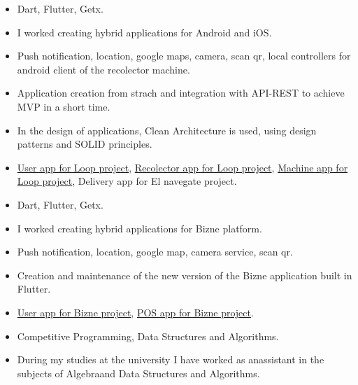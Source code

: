 \documentclass[10pt,a4paper]{altacv}
\begin{document}
\divider

\begin{itemize}
	\item Dart, Flutter, Getx.
	\item I worked creating hybrid applications for Android and iOS.
	\item Push notification, location, google maps, camera,
	      scan qr, local controllers for android client of the recolector machine.
	\item Application creation from strach and integration with API-REST to achieve MVP in a short time.
	\item In the design of applications, Clean Architecture is used, using design patterns and SOLID principles.
	\item \href{https://land.mideyneutraliza.com/}{User app for Loop project},
	      \href{https://land.mideyneutraliza.com/}{Recolector app for Loop project}, \href{https://land.mideyneutraliza.com/}{Machine app for Loop project}, Delivery app for El navegate project.

\end{itemize}

\divider


\begin{itemize}

	\item Dart, Flutter, Getx.
	\item I worked creating hybrid applications for Bizne platform.
	\item Push notification, location, google map, camera service,
	      scan qr.
	\item Creation and maintenance of the new version of the Bizne application built in Flutter.
	\item \href{https://play.google.com/store/apps/details?id=mx.devbizne.bizne&hl=en-US}{User app for Bizne project},
	      \href{https://play.google.com/store/apps/details?id=mx.bizne.kitchen&hl=en-US}{POS app for Bizne project}.
\end{itemize}

\divider


\begin{itemize}

	\item Competitive Programming, Data Structures and Algorithms.
	\item  During my studies at the university I have worked as anassistant in the subjects of Algebraand Data Structures and Algorithms.


\end{itemize}
\end{document}

